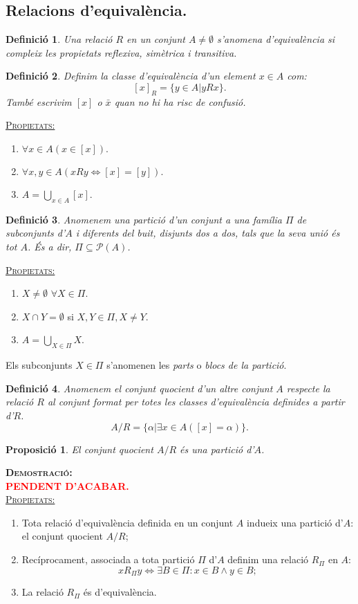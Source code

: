 \documentclass[11pt]{article}
\newcommand{\propietats}{\underline{{\scshape Propietats:}}}
\newtheorem{defi}{Definició}[section]
\newtheorem{prop}{Proposició}[section]
\newcommand{\demostracio}{\textbf{{\scshape Demostració:}}\\}
\newcommand{\pendent}{\textcolor{red}{\textbf{PENDENT D'ACABAR.}}}
\begin{document}
\subsection{Relacions d'equivalència.}
\begin{defi} Una relació $R$ en un conjunt $A\neq\emptyset$ s'anomena \textit{d'equivalència} si compleix les propietats reflexiva, simètrica i transitiva.\end{defi}
\begin{defi} Definim la \textit{classe d'equivalència} d'un element $x\in A$ com:
$$[x]_R=\{y\in A|yRx\}.$$
També escrivim $[x]$ o $\bar{x}$ quan no hi ha risc de confusió.\end{defi}
\propietats \begin{enumerate}
	\item $\forall x\in A(x\in [x]).$
	\item $\forall x,y\in A (xRy\iff [x]=[y]).$
	\item $A=\bigcup_{x\in A}[x].$
\end{enumerate}
\begin{defi} Anomenem una \textit{partició d'un conjunt} a una família $\Pi$ de subconjunts d'$A$ i diferents del buit, disjunts dos a dos, tals que la seva unió és tot $A$. És a dir, $\Pi\subseteq\mathcal{P}(A)$.\end{defi}
\propietats
\begin{enumerate}
	\item $X\neq\emptyset$ $\forall X\in\Pi.$
	\item $X\cap Y = \emptyset$ si $X,Y\in\Pi,X\neq Y.$
	\item $A=\bigcup_{X\in\Pi}X.$
\end{enumerate}
Els subconjunts $X\in\Pi$ s'anomenen les \textit{parts} o \textit{blocs de la partició}.\\
\begin{defi} Anomenem el \textit{conjunt quocient} d'un altre conjunt $A$ respecte la relació $R$ al conjunt format per totes les classes d'equivalència definides a partir d'$R$.$$A/R=\{\alpha|\exists x\in A([x]=\alpha)\}.$$\end{defi}
\begin{prop} El conjunt quocient $A/R$ és una partició d'$A$.\end{prop}
\noindent\demostracio\pendent\\
\noindent\propietats
\begin{enumerate}
	\item Tota relació d'equivalència definida en un conjunt $A$ indueix una partició d'$A$: el conjunt quocient $A/R$;
	\item Recíprocament, associada a tota partició $\Pi$ d'$A$ definim una relació $R_\Pi$ en $A$:
	$$xR_\Pi y\iff\exists B\in\Pi:x\in B\wedge y\in B;$$
	\item La relació $R_\Pi$ és d'equivalència.
\end{enumerate}
\end{document}
